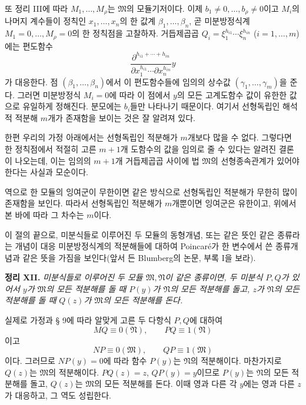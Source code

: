 또 정리 III에 따라 \(M_1,\ldots,M_\rho\)는 \(\mathfrak M\)의 모듈기저이다. 이제 \(b_1\ne0,\ldots,b_\rho\ne0\)이고 \(M_i\)의 나머지 계수들이 정칙인 \(x_1,\ldots,x_n\)의 한 값계 \(\beta_1,\ldots,\beta_n\), 곧 미분방정식계 \(M_1=0,\ldots,M_\rho=0\)의 한 정칙점을 고찰하자. 거듭제곱곱 \(Q_i=\xi_1^{h_{i1}}\cdots\xi_n^{h_{in}}\) (\(i=1,\ldots,m\))에는 편도함수
\[
 \frac{\partial^{h_{i1}+\cdots+h_{in}}}
 {\partial x_1^{h_{i1}}\cdots\partial x_n^{h_{in}}}y
\]
가 대응한다. 점 \((\beta_1,\ldots,\beta_n)\)에서 이 편도함수들에 임의의 상수값 \((\gamma_1,\ldots,\gamma_m)\)을 준다. 그러면 미분방정식 \(M_i=0\)에 따라 이 점에서 \(y\)의 모든 고계도함수 값이 유한한 값으로 유일하게 정해진다. 분모에는 \(b_i\)들만 나타나기 때문이다. 여기서 선형독립인 해석적 적분해 \(m\)개가 존재함을 보이는 것은 잘 알려져 있다.

한편 우리의 가정 아래에서는 선형독립인 적분해가 \(m\)개보다 많을 수 없다. 그렇다면 한 정칙점에서 적절히 고른 \(m+1\)개 도함수의 값을 임의로 줄 수 있다는 알려진 결론이 나오는데, 이는 임의의 \(m+1\)개 거듭제곱곱 사이에 법 \(\mathfrak M\)의 선형종속관계가 있어야 한다는 사실과 모순이다.

역으로 한 모듈의 잉여군이 무한이면 같은 방식으로 선형독립인 적분해가 무한히 많이 존재함을 보인다. 따라서 선형독립인 적분해가 \(m\)개뿐이면 잉여군은 유한이고, 위에서 본 바에 따라 그 차수는 \(m\)이다.

이 절의 끝으로, 미분식들로 이루어진 두 모듈의 동형개념, 또는 같은 뜻인 같은 종류라는 개념이 대응 미분방정식계의 적분해들에 대하여 Poincaré가 한 변수에서 쓴 종류개념과 같은 뜻을 가짐을 보인다(앞서 든 Blumberg의 논문, 부록 I을 보라).

\textbf{정리 XII.} \emph{미분식들로 이루어진 두 모듈 \(\mathfrak M,\mathfrak N\)이 같은 종류이면, 두 미분식 \(P,Q\)가 있어서 \(y\)가 \(\mathfrak M\)의 모든 적분해를 돌 때 \(P(y)\)가 \(\mathfrak N\)의 모든 적분해를 돌고, \(z\)가 \(\mathfrak N\)의 모든 적분해를 돌 때 \(Q(z)\)가 \(\mathfrak M\)의 모든 적분해를 돈다.}

실제로 가정과 § 9에 따라 알맞게 고른 두 다항식 \(P,Q\)에 대하여
\[
 MQ\equiv0(\mathfrak N),\qquad PQ\equiv1(\mathfrak N)
\]
이고
\[
 NP\equiv0(\mathfrak M),\qquad QP\equiv1(\mathfrak M)
\]
이다. 그러므로 \(NP(y)=0\)에 따라 함수 \(P(y)\)는 \(\mathfrak N\)의 적분해이다. 마찬가지로 \(Q(z)\)는 \(\mathfrak M\)의 적분해이다. \(PQ(z)=z\), \(QP(y)=y\)이므로 \(P(y)\)는 \(\mathfrak N\)의 모든 적분해를 돌고, \(Q(z)\)는 \(\mathfrak M\)의 모든 적분해를 돈다. 이때 영과 다른 각 \(y\)에는 영과 다른 \(z\)가 대응하고, 그 역도 성립한다.

